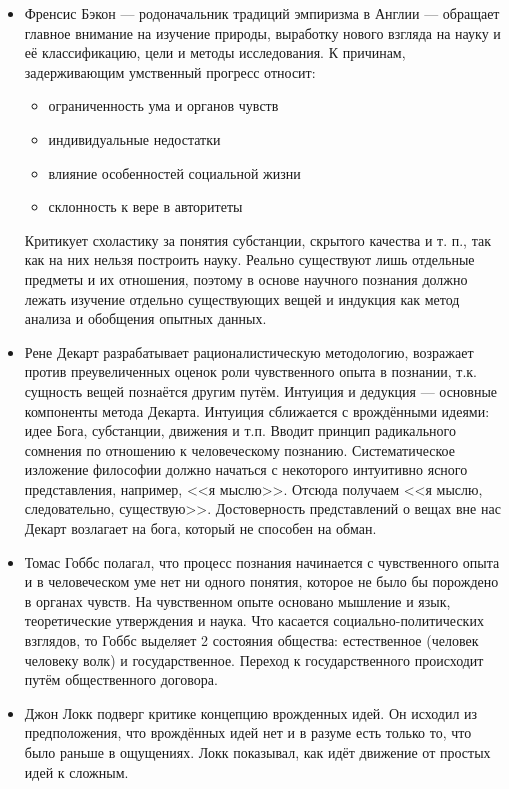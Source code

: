 \begin{itemize}
    \item Френсис Бэкон --- родоначальник традиций эмпиризма в Англии --- обращает главное внимание на изучение природы, выработку нового взгляда на науку и её классификацию, цели и методы исследования. К причинам, задерживающим умственный прогресс относит:
    \begin{itemize}
        \item ограниченность ума и органов чувств
        \item индивидуальные недостатки
        \item влияние особенностей социальной жизни
        \item склонность к вере в авторитеты
    \end{itemize}
    Критикует схоластику за понятия субстанции, скрытого качества и т. п., так как на них нельзя построить науку. Реально существуют лишь отдельные предметы и их отношения, поэтому в основе научного познания должно лежать изучение отдельно существующих вещей и индукция как метод анализа и обобщения опытных данных.
    \item Рене Декарт разрабатывает рационалистическую методологию, возражает против преувеличенных оценок роли чувственного опыта в познании, т.к. сущность вещей познаётся другим путём. Интуиция и дедукция --- основные компоненты метода Декарта. Интуиция сближается с врождёнными идеями: идее Бога, субстанции, движения и т.п. Вводит принцип радикального сомнения по отношению к человеческому познанию. Систематическое изложение философии должно начаться с некоторого интуитивно ясного представления, например, <<я мыслю>>. Отсюда получаем <<я мыслю, следовательно, существую>>. Достоверность представлений о вещах вне нас Декарт возлагает на бога, который не способен на обман.
    \item Томас Гоббс полагал, что процесс познания начинается с чувственного опыта и в человеческом уме нет ни одного понятия, которое не было бы порождено в органах чувств. На чувственном опыте основано мышление и язык, теоретические утверждения и наука.
    Что касается социально-политических взглядов, то Гоббс выделяет 2 состояния общества: естественное (человек человеку волк) и государственное. Переход к государственного происходит путём общественного договора.
    \item Джон Локк подверг критике концепцию врожденных идей. Он исходил из предположения, что врождённых идей нет и в разуме есть только то, что было раньше в ощущениях. Локк показывал, как идёт движение от простых идей к сложным.

\end{itemize}
